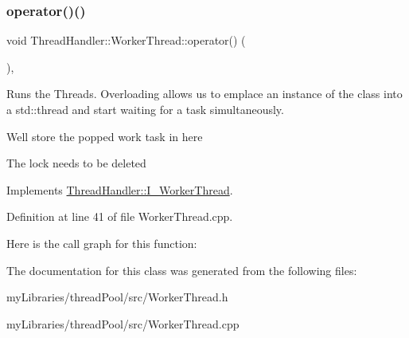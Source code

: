 \subsubsection{\texorpdfstring{operator()()}{operator()()}}
{\footnotesize\ttfamily void Thread\+Handler\+::\+Worker\+Thread\+::operator() (\begin{DoxyParamCaption}{ }\end{DoxyParamCaption})\hspace{0.3cm}{\ttfamily [override]}, {\ttfamily [virtual]}}



Runs the Threads. Overloading allows us to emplace an instance of the class into a std\+::thread and start waiting for a task simultaneously. 

We\textquotesingle{}ll store the popped work task in here

The lock needs to be deleted 

Implements \mbox{\hyperlink{classThreadHandler_1_1I__WorkerThread_ac3cc1cc1d0c7830b5b3a2425d55ac48d}{Thread\+Handler\+::\+I\+\_\+\+Worker\+Thread}}.



Definition at line 41 of file Worker\+Thread.\+cpp.

Here is the call graph for this function\+:


The documentation for this class was generated from the following files\+:\begin{DoxyCompactItemize}
\item 
my\+Libraries/thread\+Pool/src/Worker\+Thread.\+h\item 
my\+Libraries/thread\+Pool/src/Worker\+Thread.\+cpp\end{DoxyCompactItemize}
